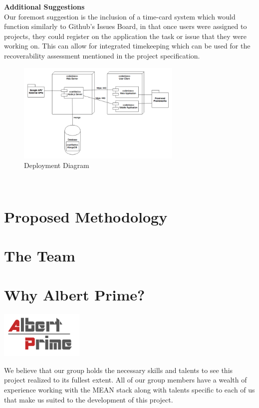 \documentclass[12pt]{article}
\begin{document}
	\textbf{Additional Suggestions}\\
	Our foremost suggestion is the inclusion of a time-card system which would function similarly to Github's Issues Board, in that once users were assigned to projects, they could register on the application the task or issue that they were working on. This can allow for integrated timekeeping which can be used for the recoverability assessment mentioned in the project specification.\\
	\setlength{\fboxsep}{15pt}
	\begin{figure}[htb]
	\centering\includegraphics[width=0.7\textwidth]{deployment.png}
	\caption{Deployment Diagram}
	\end{figure}\\

	\newpage
	\section{Proposed Methodology}
	
	\newpage
	\section{The Team}
	

	\newpage
	\section{Why Albert Prime?}
	\begin{center}
    	\includegraphics[width=4cm]{../Common/AlbertPrimeLogo.png}
	\end{center}
	We believe that our group holds the necessary skills and talents to see this project realized to its fullest extent. All of our group members have a wealth of experience working with the MEAN stack along with talents specific to each of us that make us suited to the development of this project.\\
	
\end{document}
